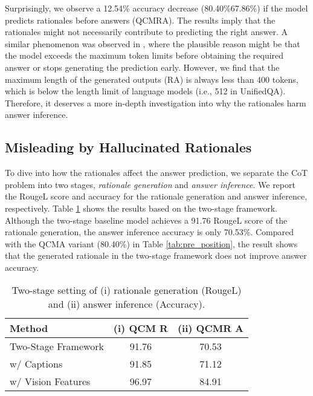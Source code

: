 \documentclass[nohyperref]{article}
\theoremstyle{plain}
\theoremstyle{definition}
\theoremstyle{remark}
\begin{document}
Surprisingly, we observe a 12.54\% accuracy decrease (80.40\%67.86\%) if the model predicts rationales before answers (QCMRA). The results imply that the rationales might not necessarily contribute to predicting the right answer. A similar phenomenon was observed in \citet{lu2022learn}, where the plausible reason might be that the model exceeds the maximum token limits before obtaining the required answer or stops generating the prediction early. However, we find that the maximum length of the generated outputs (RA) is always less than 400 tokens, which is below the length limit of language models (i.e., 512 in UnifiedQA).
Therefore, it deserves a more in-depth investigation into why the rationales harm answer inference.


\subsection{Misleading by Hallucinated Rationales}\label{sec:misleading}
To dive into how the rationales affect the answer prediction, we separate the CoT problem into two stages, \textit{rationale generation} and \textit{answer inference}. We report the RougeL score and accuracy for the rationale generation and answer inference, respectively. Table \ref{tab:pre_decoupled} shows the results based on the two-stage framework. Although the two-stage baseline model achieves a 91.76 RougeL score of the rationale generation, the answer inference accuracy is only 70.53\%. Compared with the QCMA variant (80.40\%) in Table \ref{tab:pre_position}, the result shows that the generated rationale in the two-stage framework does not improve answer accuracy.


\begin{table}[htb]
\vspace{-3.6mm}
    \centering\small
        \caption{{Two-stage} setting of (i) rationale generation (RougeL) and (ii) answer inference (Accuracy). \label{tab:pre_decoupled}}
\begin{tabular}{lcc}\toprule
 {Method} & {(i) QCM R}  & {(ii) QCMR A}  \\\midrule
 Two-Stage Framework & 91.76 & 70.53 \\
 \midrule
 \quad w/ Captions & 91.85 & 71.12 \\
 \quad w/ Vision Features & 96.97 &	84.91 \\
\bottomrule
\end{tabular}
\end{table}

 
\end{document}
